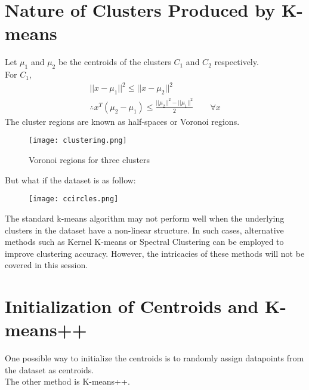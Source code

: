 \documentclass[letterpaper,11pt]{article}
\begin{document}
\section{Nature of Clusters Produced by K-means}

Let $\mu _1$ and $\mu _2$ be the centroids of the clusters $C_1$ and $C_2$ respectively. \\
For $C_1$,
\begin{gather*}
    {|| x - \mu _{1} ||}^2 \le {|| x - \mu _{2} ||}^2 \\
    \therefore x^T(\mu _2 - \mu _1) \le \frac{||\mu _2||^2 - ||\mu _1||^2}{2} \hspace{2em} \forall x
\end{gather*}
The cluster regions are known as half-spaces or Voronoi regions.

\begin{figure*} [h]
    \centering
    \texttt{[image: clustering.png]}
    \caption{Voronoi regions for three clusters}
\end{figure*}
But what if the dataset is as follow:

\begin{figure*} [h]
    \centering
    \texttt{[image: ccircles.png]}
\end{figure*}
The standard k-means algorithm may not perform well when the underlying clusters in the dataset have a non-linear structure. In such cases, alternative methods such as Kernel K-means or Spectral Clustering can be employed to improve clustering accuracy. However, the intricacies of these methods will not be covered in this session.

\section{Initialization of Centroids and K-means++}

One possible way to initialize the centroids is to randomly assign datapoints from the dataset as centroids. \\
The other method is K-means++.
\end{document}
